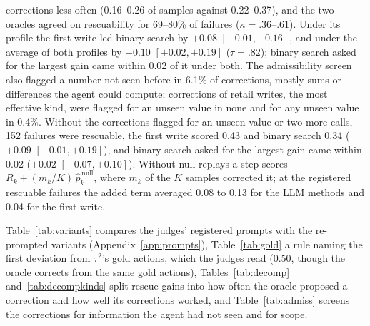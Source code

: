 \documentclass[11pt]{article}
\newcommand{\Rhat}{R(\hat{k})}
\begin{document}
corrections less often (0.16--0.26 of samples against 0.22--0.37), and the two oracles agreed on rescuability for 69--80\% of failures ($\kappa=.36$--$.61$). Under its profile the first write led binary search by $+0.08$ $[+0.01,+0.16]$, and under the average of both profiles by $+0.10$ $[+0.02,+0.19]$ ($\tau=.82$); binary search asked for the largest gain came within 0.02 of it under both. The admissibility screen also flagged a number not seen before in 6.1\% of corrections, mostly sums or differences the agent could compute; corrections of retail writes, the most effective kind, were flagged for an unseen value in none and for any unseen value in 0.4\%. Without the corrections flagged for an unseen value or two more calls, 152 failures were rescuable, the first write scored 0.43 and binary search 0.34 ($+0.09$ $[-0.01,+0.19]$), and binary search asked for the largest gain came within 0.02 ($+0.02$ $[-0.07,+0.10]$). Without null replays a step scores $R_k+(m_k/K)\,\hat{p}^{\,\mathrm{null}}_k$, where $m_k$ of the $K$ samples corrected it; at the registered rescuable failures the added term averaged 0.08 to 0.13 for the LLM methods and 0.04 for the first write.

Table~\ref{tab:variants} compares the judges' registered prompts with the re-prompted variants (Appendix~\ref{app:prompts}), Table~\ref{tab:gold} a rule naming the first deviation from $\tau^2$'s gold actions, which the judges read (0.50, though the oracle corrects from the same gold actions), Tables~\ref{tab:decomp} and~\ref{tab:decompkinds} split rescue gains into how often the oracle proposed a correction and how well its corrections worked, and Table~\ref{tab:admiss} screens the corrections for information the agent had not seen and for scope.

\begin{table}[t]
\centering
\small
\setlength{\tabcolsep}{3pt}
\caption{Judges with their registered prompt (earliest decisive mistake) and post hoc variants: the step most likely to rescue the task, the step with the largest gain over letting the agent act again, and the registered definition without grading information or hidden instructions (what counterfactual search sees); and search with and without its replays. On the 157 rescuable failures: mean $\Rhat$, exact agreement with the best rescue step, mean relative position of the named step, dollars per failure (mean over domains), and the paired difference in pooled $\Rhat$ from the registered prompt (search@40: from search@0) with a cluster-bootstrap interval.}
\label{tab:variants}
\end{table}
\end{document}
